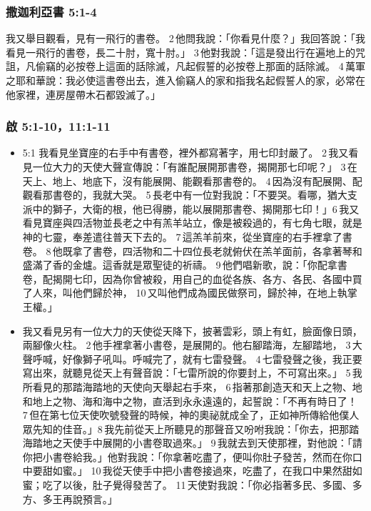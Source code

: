 \subsubsection{撒迦利亞書 5:1-4}
我又舉目觀看，見有一飛行的書卷。 2 他問我說：「你看見什麼？」我回答說：「我看見一飛行的書卷，長二十肘，寬十肘。」 3 他對我說：「這是發出行在遍地上的咒詛，凡偷竊的必按卷上這面的話除滅，凡起假誓的必按卷上那面的話除滅。 4 萬軍之耶和華說：我必使這書卷出去，進入偷竊人的家和指我名起假誓人的家，必常在他家裡，連房屋帶木石都毀滅了。」

\subsubsection{啟 5:1-10，11:1-11}
\begin{itemize} 
\itemsep-.25em
\item 5:1 我看見坐寶座的右手中有書卷，裡外都寫著字，用七印封嚴了。 2 我又看見一位大力的天使大聲宣傳說：「有誰配展開那書卷，揭開那七印呢？」 3 在天上、地上、地底下，沒有能展開、能觀看那書卷的。 4 因為沒有配展開、配觀看那書卷的，我就大哭。 5 長老中有一位對我說：「不要哭。看哪，猶大支派中的獅子，大衛的根，他已得勝，能以展開那書卷、揭開那七印！」6 我又看見寶座與四活物並長老之中有羔羊站立，像是被殺過的，有七角七眼，就是神的七靈，奉差遣往普天下去的。 7 這羔羊前來，從坐寶座的右手裡拿了書卷。 8 他既拿了書卷，四活物和二十四位長老就俯伏在羔羊面前，各拿著琴和盛滿了香的金爐。這香就是眾聖徒的祈禱。 9 他們唱新歌，說：「你配拿書卷，配揭開七印，因為你曾被殺，用自己的血從各族、各方、各民、各國中買了人來，叫他們歸於神， 10 又叫他們成為國民做祭司，歸於神，在地上執掌王權。」
\item 我又看見另有一位大力的天使從天降下，披著雲彩，頭上有虹，臉面像日頭，兩腳像火柱。 2 他手裡拿著小書卷，是展開的。他右腳踏海，左腳踏地， 3 大聲呼喊，好像獅子吼叫。呼喊完了，就有七雷發聲。 4 七雷發聲之後，我正要寫出來，就聽見從天上有聲音說：「七雷所說的你要封上，不可寫出來。」 5 我所看見的那踏海踏地的天使向天舉起右手來， 6 指著那創造天和天上之物、地和地上之物、海和海中之物，直活到永永遠遠的，起誓說：「不再有時日了！ 7 但在第七位天使吹號發聲的時候，神的奧祕就成全了，正如神所傳給他僕人眾先知的佳音。」8 我先前從天上所聽見的那聲音又吩咐我說：「你去，把那踏海踏地之天使手中展開的小書卷取過來。」 9 我就去到天使那裡，對他說：「請你把小書卷給我。」他對我說：「你拿著吃盡了，便叫你肚子發苦，然而在你口中要甜如蜜。」 10 我從天使手中把小書卷接過來，吃盡了，在我口中果然甜如蜜；吃了以後，肚子覺得發苦了。 11 天使對我說：「你必指著多民、多國、多方、多王再說預言。」
\end{itemize} 






